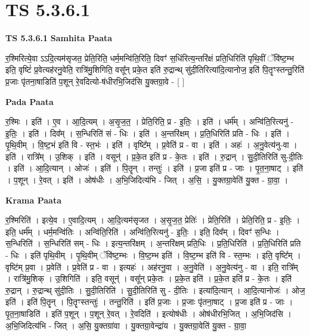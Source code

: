 \documentclass[17pt]{extarticle}
\begin{document}
\section{ TS 5.3.6.1 }

\textbf{TS 5.3.6.1 } \newline
\textbf{Samhita Paata} \newline

र॒श्मिरित्ये॒वा ऽऽदि॒त्यम॑सृजत॒ प्रेति॒रिति॒ धर्म॒मन्वि॑ति॒रिति॒ दिवꣳ॑ स॒धिंरित्य॒न्तरि॑क्षं प्रति॒धिरिति॑ पृथि॒वीं ॅवि॑ष्ट॒म्भ इति॒ वृष्टिं॑ प्र॒वेत्यह॑रनु॒वेति॒ रात्रि॑मु॒शिगिति॒ वसू᳚न् प्रके॒त इति॑ रु॒द्रान्थ् सु॑दी॒तिरित्या॑दि॒त्यानोज॒ इति॑ पि॒तॄꣳस्तन्तु॒रिति॑ प्र॒जाः पृ॑तना॒षाडिति॑ प॒शून् रे॒वदित्यो-ष॑धीरभि॒जिद॑सि यु॒क्तग्रा॒वे - [  ] \newline

\textbf{Pada Paata} \newline

र॒श्मिः । इति॑ । ए॒व । आ॒दि॒त्यम् । अ॒सृ॒ज॒त॒ । प्रेति॒रिति॒ प्र - इ॒तिः॒ । इति॑ । धर्म᳚म् । अन्वि॑ति॒रित्यनु॑ - इ॒तिः॒ । इति॑ । दिव᳚म् । स॒न्धिरिति॑ सं - धिः । इति॑ । अ॒न्तरि॑क्षम् । प्र॒ति॒धिरिति॑ प्रति - धिः । इति॑ । पृ॒थि॒वीम् । वि॒ष्ट॒भं इति॑ वि - स्त॒भंः । इति॑ । वृष्टि᳚म् । प्र॒वेति॑ प्र - वा । इति॑ । अहः॑ । अ॒नु॒वेत्य॑नु-वा । इति॑ । रात्रि᳚म् । उ॒शिक् । इति॑ । वसून्॑ । प्र॒के॒त इति॑ प्र - के॒तः । इति॑ । रु॒द्रान् । सु॒दी॒तिरिति॑ सु-दी॒तिः । इति॑ । आ॒दि॒त्यान् । ओजः॑ । इति॑ । पि॒तॄन् । तन्तुः॑ । इति॑ । प्र॒जा इति॑ प्र - जाः । पृ॒त॒ना॒षाट् । इति॑ । प॒शून् । रे॒वत् । इति॑ । ओष॑धीः । अ॒भि॒जिदित्य॑भि - जित् । अ॒सि॒ । यु॒क्तग्रा॒वेति॑ यु॒क्त - ग्रा॒वा॒ ।  \newline


\textbf{Krama Paata} \newline

र॒श्मिरिति॑ । इत्ये॒व । ए॒वादि॒त्यम् । आ॒दि॒त्यम॑सृजत । अ॒सृ॒ज॒त॒ प्रेतिः॑ । प्रेति॒रिति॑ । प्रेति॒रिति॒ प्र - इ॒तिः॒ । इति॒ धर्म᳚म् । धर्म॒मन्वि॑तिः । अन्वि॑ति॒रिति॑ । अन्वि॑ति॒रित्यनु॑ - इ॒तिः॒ । इति॒ दिव᳚म् । दिवꣳ॑ स॒न्धिः । स॒न्धिरिति॑ । स॒न्धिरिति॑ सम् - धिः । इत्य॒न्तरि॑क्षम् । अ॒न्तरि॑क्षम् प्रति॒धिः । प्र॒ति॒धिरिति॑ । प्र॒ति॒धिरिति॑ प्रति - धिः । इति॑ पृथि॒वीम् । पृ॒थि॒वीम् ॅवि॑ष्ट॒म्भः । वि॒ष्ट॒म्भ इति॑ । वि॒ष्ट॒म्भ इति॑ वि - स्त॒म्भः । इति॒ वृष्टि᳚म् । वृष्टि॑म् प्र॒वा । प्र॒वेति॑ । प्र॒वेति॑ प्र - वा । इत्यहः॑ । अह॑रनु॒वा । अ॒नु॒वेति॑ । अ॒नु॒वेत्य॑नु - वा । इति॒ रात्रि᳚म् । रात्रि॑मु॒शिक् । उ॒शिगिति॑ । इति॒ वसून्॑ । वसू᳚न् प्रके॒तः । प्र॒के॒त इति॑ । प्र॒के॒त इति॑ प्र - के॒तः । इति॑ रु॒द्रान् । रु॒द्रान्थ् सु॑दी॒तिः । सु॒दी॒तिरिति॑ । सु॒दी॒तिरिति॑ सु - दी॒तिः । इत्या॑दि॒त्यान् । आ॒दि॒त्यानोजः॑ । ओज॒ इति॑ । इति॑ पि॒तॄन् । पि॒तॄꣳस्तन्तुः॑ । तन्तु॒रिति॑ । इति॑ प्र॒जाः । प्र॒जाः पृ॑तना॒षाट् । प्र॒जा इति॑ प्र - जाः । पृ॒त॒ना॒षाडिति॑ । इति॑ प॒शून् । प॒शून् रे॒वत् । रे॒वदिति॑ । इत्योष॑धीः । ओष॑धीरभि॒जित् । अ॒भि॒जिद॑सि । अ॒भि॒जिदित्य॑भि - जित् । अ॒सि॒ यु॒क्तग्रा॑वा । यु॒क्तग्रा॒वेन्द्रा॑य । यु॒क्तग्रा॒वेति॑ यु॒क्त - ग्रा॒वा॒ \newline
\end{document}
